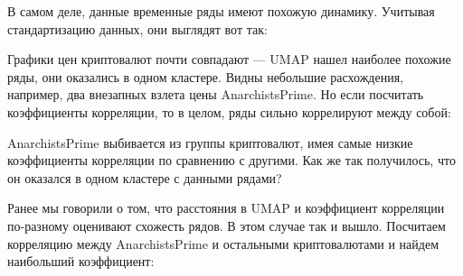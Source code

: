 В самом деле, данные временные ряды имеют похожую динамику. Учитывая стандартизацию данных, они выглядят вот так:

\begin{figure}[H]
	\noindent {}
\end{figure}

Графики цен криптовалют почти совпадают --- UMAP нашел наиболее похожие ряды, они оказались в одном кластере. Видны небольшие расхождения, например, два внезапных взлета цены AnarchistsPrime. Но если посчитать коэффициенты корреляции, то в целом, ряды сильно коррелируют между собой:

\begin{figure}[H]
	\noindent {}
\end{figure} 

AnarchistsPrime выбивается из группы криптовалют, имея самые низкие коэффициенты корреляции по сравнению с другими. Как же так получилось, что он оказался в одном кластере с данными рядами?

Ранее мы говорили о том, что расстояния в UMAP и коэффициент корреляции по-разному оценивают схожесть рядов. В этом случае так и вышло. Посчитаем корреляцию между AnarchistsPrime и остальными криптовалютами и найдем наибольший коэффициент:

\begin{figure}[H]
	\noindent {}
\end{figure} 

